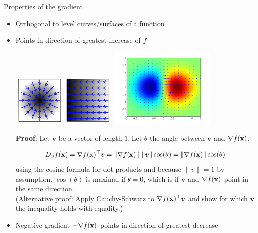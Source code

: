 \begin{vbframe}{Properties of the gradient}

\begin{itemize}
	\item Orthogonal to level curves/surfaces of a function
	\item Points in direction of greatest increase of $f$
	\begin{center}
		\includegraphics[width = 0.4\textwidth]{figure_man/gradient3.png} \includegraphics[width = 0.4\textwidth]{figure_man/gradient.png}
	\end{center}
	\begin{footnotesize}
	\textbf{Proof}: Let $\bm{v}$ be a vector of length $1$. Let $\theta$ the angle between $\bm{v}$ and $\nabla f(\mathbf{x})$. 
 
	$$
		D_{\bm{v}}f(\mathbf{x}) = \nabla f(\mathbf{x})^\top \bm{v} = \|\nabla f(\mathbf{x})\|~\|\bm{v}\|\cos(\theta) = \|\nabla f(\mathbf{x})\| \cos(\theta)
	$$
	using the cosine formula for dot products and because $\|v\| = 1$ by assumption. $\cos(\theta)$ is maximal if $\theta = 0$, which is if $\bm{v}$ and $\nabla f(\mathbf{x})$ point in the same direction. \\
	(Alternative proof: Apply Cauchy-Schwarz to $\nabla f(\mathbf{x})^\top \bm{v}$ and show for which $\bm{v}$ the inequality holds with equality.)  
	\end{footnotesize}
\end{itemize}


\framebreak

\begin{itemize}
	\item Negative gradient $- \nabla f(\mathbf{x})$ points in direction of greatest decrease
\end{itemize}


\end{vbframe}
